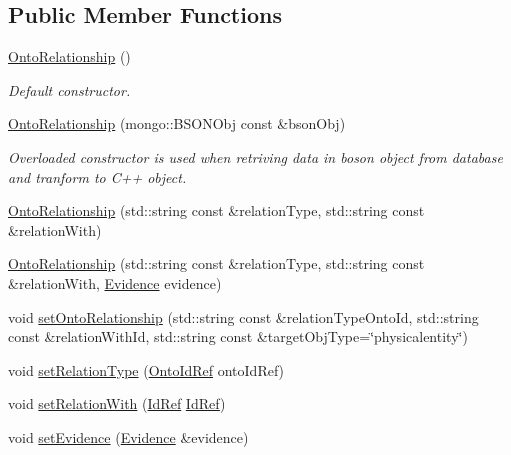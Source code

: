 \subsection*{Public Member Functions}
\begin{DoxyCompactItemize}
\item 
\hyperlink{classunisys_1_1OntoRelationship_a96dc6a8db059c27c326a04a25197424b}{Onto\-Relationship} ()
\begin{DoxyCompactList}\small\item\em Default constructor. \end{DoxyCompactList}\item 
\hyperlink{classunisys_1_1OntoRelationship_a18626370d6eb593993b5f6a85af94a7f}{Onto\-Relationship} (mongo\-::\-B\-S\-O\-N\-Obj const \&bson\-Obj)
\begin{DoxyCompactList}\small\item\em Overloaded constructor is used when retriving data in boson object from database and tranform to C++ object. \end{DoxyCompactList}\item 
\hyperlink{classunisys_1_1OntoRelationship_aecd635465a76a463c56346e428d61141}{Onto\-Relationship} (std\-::string const \&relation\-Type, std\-::string const \&relation\-With)
\item 
\hyperlink{classunisys_1_1OntoRelationship_a3d44115a6e96fcc5765faabc10179406}{Onto\-Relationship} (std\-::string const \&relation\-Type, std\-::string const \&relation\-With, \hyperlink{classunisys_1_1Evidence}{Evidence} evidence)
\item 
void \hyperlink{classunisys_1_1OntoRelationship_afbd810a2b739f0349839e0ff6cff5a6e}{set\-Onto\-Relationship} (std\-::string const \&relation\-Type\-Onto\-Id, std\-::string const \&relation\-With\-Id, std\-::string const \&target\-Obj\-Type=\char`\"{}physicalentity\char`\"{})
\item 
void \hyperlink{classunisys_1_1OntoRelationship_a2bb8c857ed003f208696315a8170084e}{set\-Relation\-Type} (\hyperlink{classunisys_1_1OntoIdRef}{Onto\-Id\-Ref} onto\-Id\-Ref)
\item 
void \hyperlink{classunisys_1_1OntoRelationship_a3dbfa574d2f1d6d8e9fcf744d0ef7319}{set\-Relation\-With} (\hyperlink{classunisys_1_1IdRef}{Id\-Ref} \hyperlink{classunisys_1_1IdRef}{Id\-Ref})
\item 
void \hyperlink{classunisys_1_1OntoRelationship_aaa203202398fff77c1c93e6d7786c6fb}{set\-Evidence} (\hyperlink{classunisys_1_1Evidence}{Evidence} \&evidence)
\end{DoxyCompactItemize}
